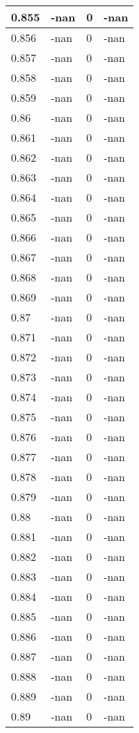 \documentclass[a4paper,14pt]{extarticle}
\begin{document}
\begin{longtable}{||m{3cm}||m{3cm}|m{3cm}||m{3cm}||}
\hline
0.855 & -nan & 0 & -nan\\
\hline
0.856 & -nan & 0 & -nan\\
\hline
0.857 & -nan & 0 & -nan\\
\hline
0.858 & -nan & 0 & -nan\\
\hline
0.859 & -nan & 0 & -nan\\
\hline
0.86 & -nan & 0 & -nan\\
\hline
0.861 & -nan & 0 & -nan\\
\hline
0.862 & -nan & 0 & -nan\\
\hline
0.863 & -nan & 0 & -nan\\
\hline
0.864 & -nan & 0 & -nan\\
\hline
0.865 & -nan & 0 & -nan\\
\hline
0.866 & -nan & 0 & -nan\\
\hline
0.867 & -nan & 0 & -nan\\
\hline
0.868 & -nan & 0 & -nan\\
\hline
0.869 & -nan & 0 & -nan\\
\hline
0.87 & -nan & 0 & -nan\\
\hline
0.871 & -nan & 0 & -nan\\
\hline
0.872 & -nan & 0 & -nan\\
\hline
0.873 & -nan & 0 & -nan\\
\hline
0.874 & -nan & 0 & -nan\\
\hline
0.875 & -nan & 0 & -nan\\
\hline
0.876 & -nan & 0 & -nan\\
\hline
0.877 & -nan & 0 & -nan\\
\hline
0.878 & -nan & 0 & -nan\\
\hline
0.879 & -nan & 0 & -nan\\
\hline
0.88 & -nan & 0 & -nan\\
\hline
0.881 & -nan & 0 & -nan\\
\hline
0.882 & -nan & 0 & -nan\\
\hline
0.883 & -nan & 0 & -nan\\
\hline
0.884 & -nan & 0 & -nan\\
\hline
0.885 & -nan & 0 & -nan\\
\hline
0.886 & -nan & 0 & -nan\\
\hline
0.887 & -nan & 0 & -nan\\
\hline
0.888 & -nan & 0 & -nan\\
\hline
0.889 & -nan & 0 & -nan\\
\hline
0.89 & -nan & 0 & -nan\\

\end{longtable}
\end{document}
